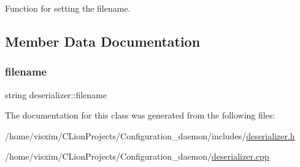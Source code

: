 Function for setting the filename. 



\subsection{Member Data Documentation}
\mbox{\label{classdeserializer_acef129bae806d64a1692d805c3755ce4}} 
\subsubsection{\texorpdfstring{filename}{filename}}
{\footnotesize\ttfamily string deserializer\+::filename\hspace{0.3cm}{\ttfamily [private]}}



The documentation for this class was generated from the following files\+:\begin{DoxyCompactItemize}
\item 
/home/visxim/\+C\+Lion\+Projects/\+Configuration\+\_\+daemon/includes/\hyperlink{deserializer_8h}{deserializer.\+h}\item 
/home/visxim/\+C\+Lion\+Projects/\+Configuration\+\_\+daemon/\hyperlink{deserializer_8cpp}{deserializer.\+cpp}\end{DoxyCompactItemize}
